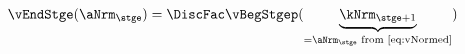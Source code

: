   \begin{equation}\begin{gathered}\begin{aligned}
\vEndStge(\aNrm_{\stge}) & = \DiscFac \vBegStgep(\underbrace{\kNrm_{\stge+1}}_{=\aNrm_{\stge}\text{ from \eqref{eq:vNormed}}}) \label{eq:vEndStge}
      \end{aligned}\end{gathered}\end{equation}
